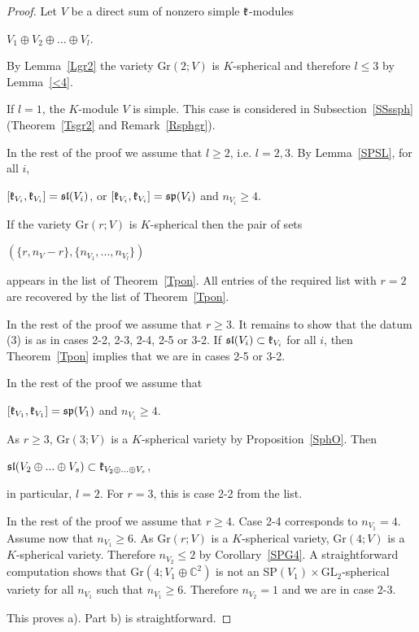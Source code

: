 \documentclass[12pt]{amsart}
\theoremstyle{definition}\newtheorem{theorem}{Theorem}[section]
\theoremstyle{definition}\newtheorem{definition}[proposition]{Definition}
\theoremstyle{remark}\newtheorem{example}[proposition]{Example}
\begin{document}
\begin{proof}Let $V$ be a direct sum of nonzero simple $\frak k$-modules \begin{center}$V_1\oplus V_2\oplus... \oplus V_l$.\end{center}By Lemma~\ref{Lgr2} the variety Gr$(2; V)$ is $K$-spherical and therefore $l\le 3$ by Lemma~\ref{<4}.

If $l=1$, the $K$-module $V$ is simple. This case is considered in Subsection~\ref{SSssph} (Theorem~\ref{Tsgr2} and Remark~\ref{Rsphgr}).

In the rest of the proof we assume that $l\ge 2$, i.e. $l=2, 3$. By Lemma~\ref{SPSL}, for all $i$, \begin{center}$[\frak k_{V_i}, \frak k_{V_i}]=\frak{sl}(V_i)$, or $[\frak k_{V_i}, \frak k_{V_i}]=\frak{sp}(V_i)$ and $n_{V_i}\ge 4$.\end{center}
If the variety Gr$(r; V)$ is $K$-spherical then the pair of sets \begin{center}$(\{r, n_V-r\}, \{n_{V_1},..., n_{V_l}\})$\end{center} appears in the list of Theorem~\ref{Tpon}. All entries of the required list with $r=2$ are recovered by the list of Theorem~\ref{Tpon}.

In the rest of the proof we assume that $r\ge 3$. It remains to show that the datum (3) is as in cases 2-2, 2-3, 2-4, 2-5 or 3-2. If $\frak{sl}(V_i)\subset\frak k_{V_i}$ for all $i$, then Theorem~\ref{Tpon} implies that we are in cases 2-5 or 3-2.

In the rest of the proof we assume that \begin{center}$[\frak k_{V_1}, \frak k_{V_1}]=\frak{sp}(V_1)$ and $n_{V_1}\ge 4$.\end{center}

As $r\ge 3$, Gr$(3; V)$ is a $K$-spherical variety by Proposition~\ref{SphO}. Then \begin{center}$\frak{sl}(V_2\oplus...\oplus V_s)\subset\frak k_{V_2\oplus...\oplus V_s}$,\end{center} in particular, $l=2$. For $r=3$, this is case 2-2 from the list.

In the rest of the proof we assume that $r\ge 4$. Case 2-4 corresponds to $n_{V_1}=4$. Assume  now that $n_{V_1}\ge 6$. As Gr$(r; V)$ is a $K$-spherical variety, Gr$(4; V)$ is a $K$-spherical variety. Therefore $n_{V_2}\le 2$ by Corollary~\ref{SPG4}. A straightforward computation shows that Gr$(4; V_1\oplus\mathbb C^2)$ is not an SP$(V_1)\times$GL$_2$-spherical variety for all $n_{V_1}$ such that $n_{V_1}\ge 6$. Therefore $n_{V_2}=1$ and we are in case 2-3.

This proves a). Part b) is straightforward.\end{proof}
\end{document}
